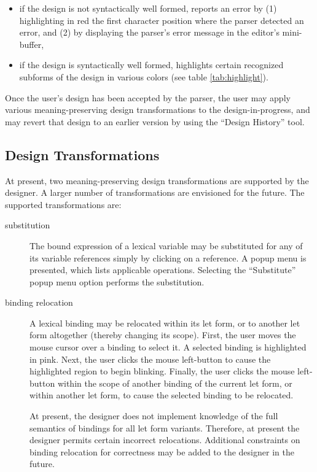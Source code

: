 \documentclass{article}
\begin{document}
\begin{itemize}
\item if the design is not syntactically well formed, reports an error
by (1) highlighting in red the first character position where the
parser detected an error, and (2) by displaying the parser's error
message in the editor's mini-buffer,

\item if the design is syntactically well formed, highlights certain
recognized subforms of the design in various colors (see table
\ref{tab:highlight}).

\end{itemize}

Once the user's design has been accepted by the parser, the user may
apply various meaning-preserving design transformations to the
design-in-progress, and may revert that design to an earlier version
by using the ``Design History'' tool.

\subsection{Design Transformations}

At present, two meaning-preserving design transformations are
supported by the designer. A larger number of transformations are
envisioned for the future.  The supported transformations are:

\begin{description}
\item[substitution] The bound expression of a lexical variable may be
substituted for any of its variable references simply by clicking on a
reference.  A popup menu is presented, which lists applicable
operations.  Selecting the ``Substitute'' popup menu option performs
the substitution.

\item[binding relocation] A lexical binding may be relocated within
its {\sf let} form, or to another {\sf let} form altogether (thereby
changing its scope).  First, the user moves the mouse cursor over a
binding to select it. A selected binding is highlighted in pink. Next,
the user clicks the mouse left-button to cause the highlighted region
to begin blinking.  Finally, the user clicks the mouse left-button
within the scope of another binding of the current {\sf let} form, or
within another {\sf let} form, to cause the selected binding to be
relocated.

At present, the designer does not implement knowledge of the full
semantics of bindings for all {\sf let} form variants. Therefore, at
present the designer permits certain incorrect relocations.
Additional constraints on binding relocation for correctness may be
added to the designer in the future.

\end{description}
\end{document}
